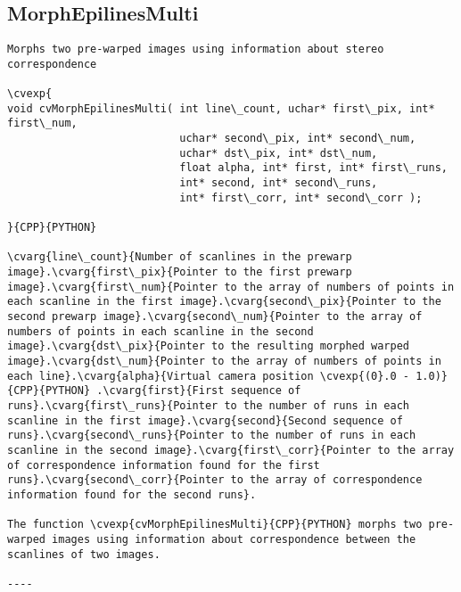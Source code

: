 \subsection{MorphEpilinesMulti}
\begin{verbatim}
Morphs two pre-warped images using information about stereo correspondence

\cvexp{
void cvMorphEpilinesMulti( int line\_count, uchar* first\_pix, int* first\_num,
                           uchar* second\_pix, int* second\_num,
                           uchar* dst\_pix, int* dst\_num,
                           float alpha, int* first, int* first\_runs,
                           int* second, int* second\_runs,
                           int* first\_corr, int* second\_corr );

}{CPP}{PYTHON}

\cvarg{line\_count}{Number of scanlines in the prewarp image}.\cvarg{first\_pix}{Pointer to the first prewarp image}.\cvarg{first\_num}{Pointer to the array of numbers of points in each scanline in the first image}.\cvarg{second\_pix}{Pointer to the second prewarp image}.\cvarg{second\_num}{Pointer to the array of numbers of points in each scanline in the second image}.\cvarg{dst\_pix}{Pointer to the resulting morphed warped image}.\cvarg{dst\_num}{Pointer to the array of numbers of points in each line}.\cvarg{alpha}{Virtual camera position \cvexp{(0}.0 - 1.0)}{CPP}{PYTHON} .\cvarg{first}{First sequence of runs}.\cvarg{first\_runs}{Pointer to the number of runs in each scanline in the first image}.\cvarg{second}{Second sequence of runs}.\cvarg{second\_runs}{Pointer to the number of runs in each scanline in the second image}.\cvarg{first\_corr}{Pointer to the array of correspondence information found for the first runs}.\cvarg{second\_corr}{Pointer to the array of correspondence information found for the second runs}.

The function \cvexp{cvMorphEpilinesMulti}{CPP}{PYTHON} morphs two pre-warped images using information about correspondence between the scanlines of two images.

----
\end{verbatim}
